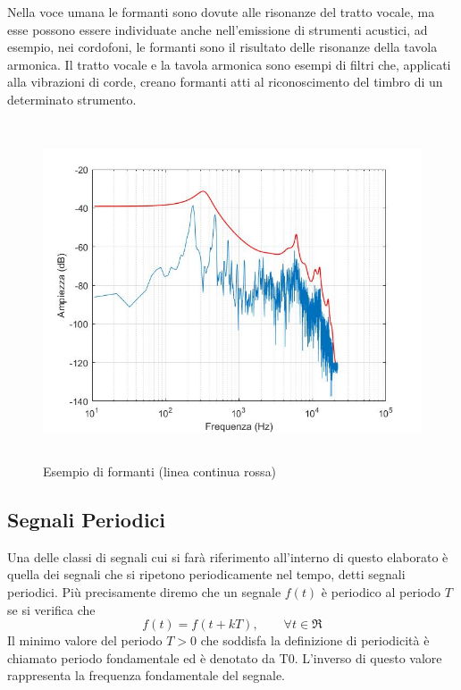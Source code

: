 \documentclass[12pt]{report}
\begin{document}
Nella voce umana le formanti sono dovute alle risonanze del tratto vocale, ma esse possono essere individuate anche nell'emissione di strumenti acustici, ad esempio, nei cordofoni, le formanti sono il risultato delle risonanze della tavola armonica. Il tratto vocale e la tavola armonica sono esempi di filtri che, applicati alla vibrazioni di corde, creano formanti atti al riconoscimento del timbro di un determinato strumento.

\begin{figure}[htbp]
\centerline{\includegraphics[height=100mm]{img/formant}}
\caption{Esempio di formanti (linea continua rossa)}
\label{fig:formant}
\end{figure}
	
	\label{cap2sec3}
	
		
	
		\subsection{Segnali Periodici}
		\label{cap2sec3_1}
		
		Una delle classi di segnali cui si farà riferimento all'interno di questo elaborato è quella dei segnali che si ripetono periodicamente nel tempo, detti segnali periodici. 
Più precisamente diremo che un segnale $f(t)$ è periodico al periodo $T$ se si verifica che $$ f(t) = f(t+kT), \qquad \forall t \in \Re $$ 
Il minimo valore del periodo $T > 0$ che soddisfa la definizione di periodicità è chiamato periodo fondamentale ed è denotato da T0. L'inverso di questo valore rappresenta la frequenza fondamentale del segnale.
		
\end{document}
